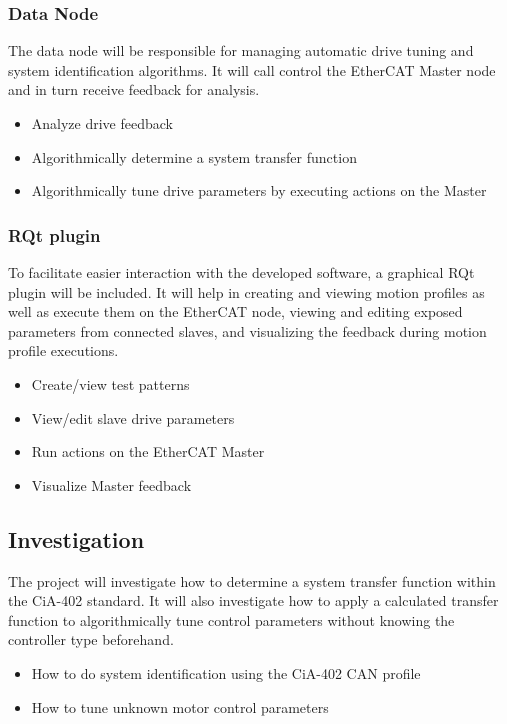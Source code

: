 \subsubsection{Data Node}

The data node will be responsible for managing automatic drive tuning and system identification algorithms. 
It will call control the EtherCAT Master node and in turn receive feedback for analysis. 

\begin{itemize}
	\setlength\itemsep{\pdescitemsep}
	\item Analyze drive feedback
	\item Algorithmically determine a system transfer function
	\item Algorithmically tune drive parameters by executing actions on the Master
\end{itemize}

\subsubsection{RQt plugin}

To facilitate easier interaction with the developed software, a graphical RQt plugin will be included. 
It will help in creating and viewing motion profiles as well as execute them on the EtherCAT node, viewing and editing exposed parameters from connected slaves, and visualizing the feedback during motion profile executions. 

\begin{itemize}
	\setlength\itemsep{\pdescitemsep}
	\item Create/view test patterns
	\item View/edit slave drive parameters
	\item Run actions on the EtherCAT Master
	\item Visualize Master feedback
\end{itemize}

\subsection{Investigation}

The project will investigate how to determine a system transfer function within the CiA-402 standard. 
It will also investigate how to apply a calculated transfer function to algorithmically tune control parameters without knowing the controller type beforehand. 

\begin{itemize}
	\setlength\itemsep{\pdescitemsep}
	\item How to do system identification using the CiA-402 CAN profile
	\item How to tune unknown motor control parameters
\end{itemize}

